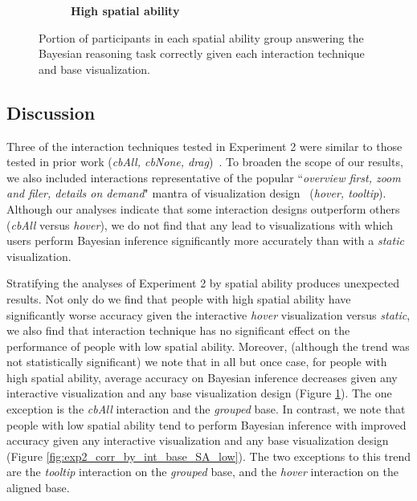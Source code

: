\begin{figure}[h!]
\begin{subfigure}[t]{0.48\columnwidth}
{\begin{bchart}[step=.25,max=1,width=\linewidth]
    
    \end{bchart}}
    \caption{\textbf{High spatial ability}}
    \label{fig:exp2_corr_by_int_base_SA_high}
    \end{subfigure}
    \caption{Portion of participants in each spatial ability group answering the Bayesian reasoning task correctly given each interaction technique and base visualization.}
    \label{fig:exp2_corr_by_int_base_SA}
\end{figure}

\subsection{Discussion} 
\label{sec:exp2:discussion}
Three of the interaction techniques tested in Experiment 2 were similar to those tested in prior work (\textit{cbAll, cbNone, drag})~\cite{tsai2011Interactive, khan2018Interactive}. To broaden the scope of our results, we also included interactions representative of the popular ``\textit{overview first, zoom and filer, details on demand}" mantra of visualization design~\cite{shneiderman1996Eyes} (\textit{hover, tooltip}). Although our analyses indicate that some interaction designs outperform others (\textit{cbAll} versus \textit{hover}), we do not find that any lead to visualizations with which users perform Bayesian inference significantly more accurately than with a \textit{static} visualization.  

Stratifying the analyses of Experiment 2 by spatial ability produces unexpected results. Not only do we find that people with high spatial ability have significantly worse accuracy given the interactive \textit{hover} visualization versus \textit{static}, we also find that interaction technique has no significant effect on the performance of people with low spatial ability.  
Moreover, (although the trend was not statistically significant) we note that in all but once case, for people with high spatial ability, average accuracy on Bayesian inference decreases given any interactive visualization and any base visualization design (Figure \ref{fig:exp2_corr_by_int_base_SA_high}). The one exception is the \textit{cbAll} interaction and the \textit{grouped} base. 
In contrast, we note that people with low spatial ability tend to perform Bayesian inference with improved accuracy given any interactive visualization and any base visualization design (Figure \ref{fig:exp2_corr_by_int_base_SA_low}). The two exceptions to this trend are the \textit{tooltip} interaction on the \textit{grouped} base, and the \textit{hover} interaction on the aligned base. 

